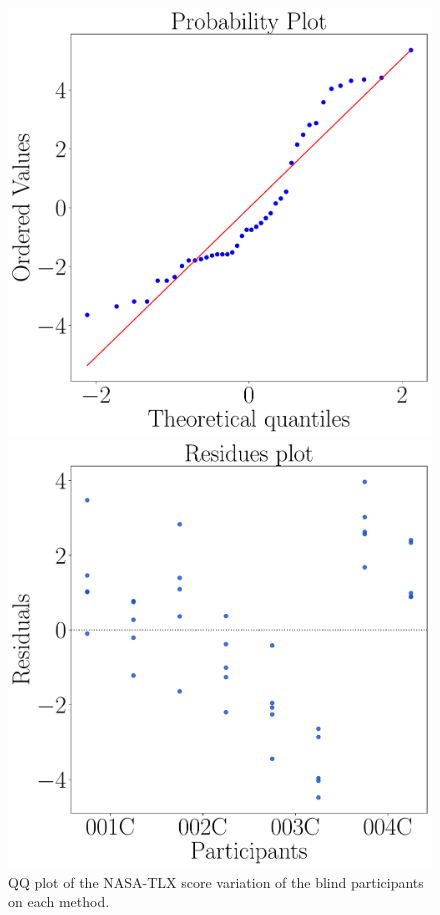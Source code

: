 \begin{figure}[!htb]
    \centering
    \begin{minipage}{0.45\textwidth}
        \centering
        \includegraphics[width = \textwidth]{Resultados/Nasa/Figuras/pdf/qqplot_nasa_avg_two_way_blind.pdf}
        \caption{QQ plot of the NASA-TLX score variation of the blind participants on each method.}
        \label{fig:qqplot_nasa_avg_two_way_blind}
    \end{minipage}
    \begin{minipage}{0.075\textwidth}
        \hfill
    \end{minipage}
    \begin{minipage}{0.45\textwidth}
        \centering
        \includegraphics[width = \textwidth]{Resultados/Nasa/Figuras/pdf/residplot_nasa_avg_two_way_blind.pdf}

\end{minipage}
\end{figure}
